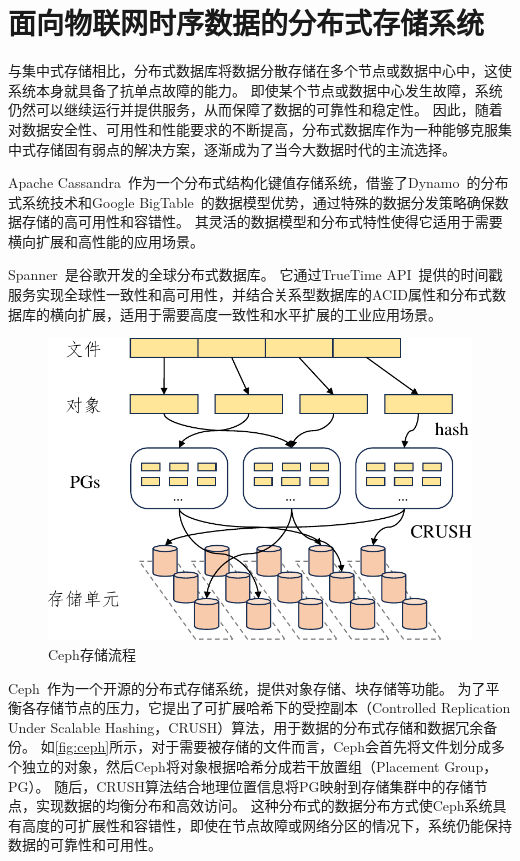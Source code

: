 \section{面向物联网时序数据的分布式存储系统}
与集中式存储相比，分布式数据库将数据分散存储在多个节点或数据中心中，这使系统本身就具备了抗单点故障的能力。
即使某个节点或数据中心发生故障，系统仍然可以继续运行并提供服务，从而保障了数据的可靠性和稳定性。
因此，随着对数据安全性、可用性和性能要求的不断提高，分布式数据库作为一种能够克服集中式存储固有弱点的解决方案，逐渐成为了当今大数据时代的主流选择。

Apache Cassandra~\cite{lakshman2010cassandra}作为一个分布式结构化键值存储系统，借鉴了Dynamo~\cite{decandia2007dynamo}的分布式系统技术和Google BigTable~\cite{chang2008bigtable}的数据模型优势，通过特殊的数据分发策略确保数据存储的高可用性和容错性。
其灵活的数据模型和分布式特性使得它适用于需要横向扩展和高性能的应用场景。

Spanner~\cite{corbett2013spanner}是谷歌开发的全球分布式数据库。
它通过TrueTime API~\cite{cervin2016truetime}提供的时间戳服务实现全球性一致性和高可用性，并结合关系型数据库的ACID属性和分布式数据库的横向扩展，适用于需要高度一致性和水平扩展的工业应用场景。

\begin{figure}[t]
    \centering
    \includegraphics[width=0.7\linewidth]{figures/timechain/ceph.pdf}
    \caption{Ceph存储流程}
    \label{fig:ceph}
\end{figure}

Ceph~\cite{weil2006ceph}作为一个开源的分布式存储系统，提供对象存储、块存储等功能。
为了平衡各存储节点的压力，它提出了可扩展哈希下的受控副本（Controlled Replication Under Scalable Hashing，CRUSH）算法，用于数据的分布式存储和数据冗余备份。
如\autoref{fig:ceph}所示，对于需要被存储的文件而言，Ceph会首先将文件划分成多个独立的对象，然后Ceph将对象根据哈希分成若干放置组（Placement Group，PG）。
随后，CRUSH算法结合地理位置信息将PG映射到存储集群中的存储节点，实现数据的均衡分布和高效访问。
这种分布式的数据分布方式使Ceph系统具有高度的可扩展性和容错性，即使在节点故障或网络分区的情况下，系统仍能保持数据的可靠性和可用性。

